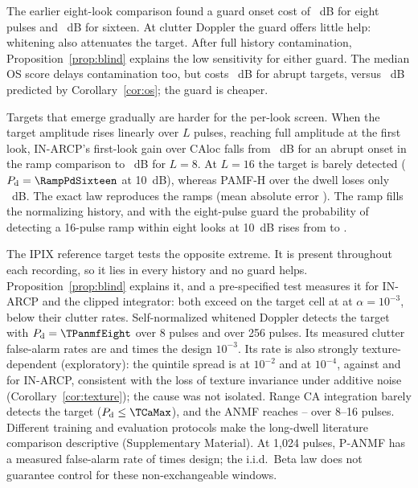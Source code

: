 \documentclass[journal]{IEEEtran}
\begin{document}
The earlier eight-look comparison found a guard onset cost of \GuardOnsetCost~dB for eight pulses and \GuardOnsetCostSixteen~dB for sixteen. At clutter Doppler the guard offers little help: whitening also attenuates the target. After full history contamination, Proposition~\ref{prop:blind} explains the low sensitivity for either guard. The median OS score delays contamination too, but costs \OsCostEight~dB for abrupt targets, versus \OSLossEight~dB predicted by Corollary~\ref{cor:os}; the guard is cheaper.

Targets that emerge gradually are harder for the per-look screen. When the target amplitude rises linearly over $L$ pulses, reaching full amplitude at the first look, IN-ARCP's first-look gain over CAloc falls from \RampGainOne~dB for an abrupt onset in the ramp comparison to \RampGainEight~dB for $L=8$. At $L=16$ the target is barely detected ($P_{\rm d}=\RampPdSixteen$ at 10~dB), whereas PAMF-H over the dwell loses only \RampPAMFLoss~dB. The exact law reproduces the ramps (mean absolute error \RampMae). The ramp fills the normalizing history, and with the eight-pulse guard the probability of detecting a 16-pulse ramp within eight looks at 10~dB rises from \GuardRampZero{} to \GuardRampEight.

\label{sec:realtarget}The IPIX reference target tests the opposite extreme. It is present throughout each recording, so it lies in every history and no guard helps. Proposition~\ref{prop:blind} explains it, and a pre-specified test measures it for IN-ARCP and the clipped integrator: both exceed on the target cell at \TargetBlindRate{} at $\alpha=10^{-3}$, below their clutter rates. Self-normalized whitened Doppler detects the target with $P_{\rm d}=\TPanmfEight$ over 8 pulses and \TPanmfTwoFiveSix{} over 256 pulses. Its measured clutter false-alarm rates are \TPanmfPfaEight{} and \TPanmfPfaTwoFiveSix{} times the design $10^{-3}$. Its rate is also strongly texture-dependent (exploratory): the quintile spread is \ConfSpreadPanmfTwo{} at $10^{-2}$ and \ConfSpreadPanmfFour{} at $10^{-4}$, against \ConfSpreadInTwo{} and \LInConfSpreadFour{} for IN-ARCP, consistent with the loss of texture invariance under additive noise (Corollary~\ref{cor:texture}); the cause was not isolated. Range CA integration barely detects the target ($P_{\rm d}\le\TCaMax$), and the ANMF reaches \TFpEight--\TFpSixteen{} over 8--16 pulses. Different training and evaluation protocols make the long-dwell literature comparison descriptive (Supplementary Material). At 1,024 pulses, P-ANMF has a measured false-alarm rate of \TPanmfPfaThousand{} times design; the i.i.d.\ Beta law does not guarantee control for these non-exchangeable windows.
\end{document}
